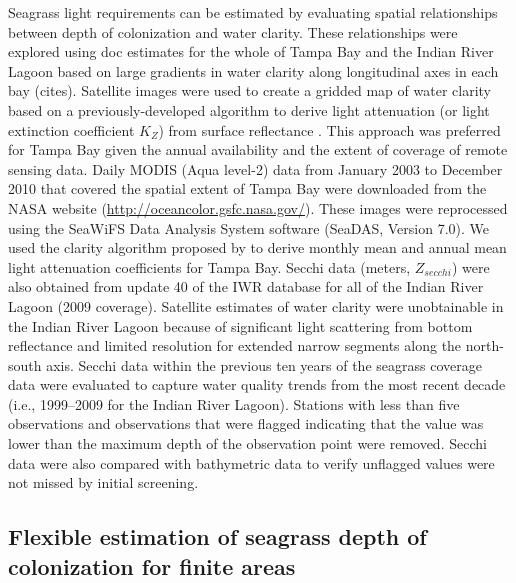 \documentclass[letterpaper,12pt,oneside]{article}\usepackage[]{graphicx}\usepackage[]{color}
\begin{document}
Seagrass light requirements can be estimated by evaluating spatial relationships between depth of colonization and water clarity.  These relationships were explored using \ac{doc} estimates for the whole of Tampa Bay and the Indian River Lagoon based on large gradients in water clarity along longitudinal axes in each bay (cites). Satellite images were used to create a gridded map of water clarity based on a previously-developed algorithm to derive light attenuation (or light extinction coefficient $K_Z$) from surface reflectance \citep{Chen07}.  This approach was preferred for Tampa Bay given the annual availability and the extent of coverage of remote sensing data.  Daily MODIS (Aqua level-2) data from January 2003 to December 2010 that covered the spatial extent of Tampa Bay were downloaded from the NASA website (\url{http://oceancolor.gsfc.nasa.gov/}). These images were reprocessed using the SeaWiFS Data Analysis System software (SeaDAS, Version 7.0). We used the clarity algorithm proposed by \citet{Chen07} to derive monthly mean and annual mean light attenuation coefficients for Tampa Bay. Secchi data (meters, $Z_{secchi}$) were also obtained from update 40 of the \ac{IWR} database for all of the Indian River Lagoon (2009 coverage). Satellite estimates of water clarity were unobtainable in the Indian River Lagoon because of significant light scattering from bottom reflectance and limited resolution for extended narrow segments along the north-south axis.  Secchi data within the previous ten years of the seagrass coverage data were evaluated to capture water quality trends from the most recent decade (i.e., 1999--2009 for the Indian River Lagoon).  Stations with less than five observations and observations that were flagged indicating that the value was lower than the maximum depth of the observation point were removed.  Secchi data were also compared with bathymetric data to verify unflagged values were not missed by initial screening. 

\subsection{Flexible estimation of seagrass depth of colonization for finite areas}
\end{document}
